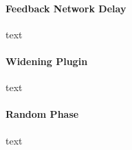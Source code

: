 \paragraph{Feedback Network Delay}
text

\paragraph{Widening Plugin}
text

\paragraph{Random Phase}
text
